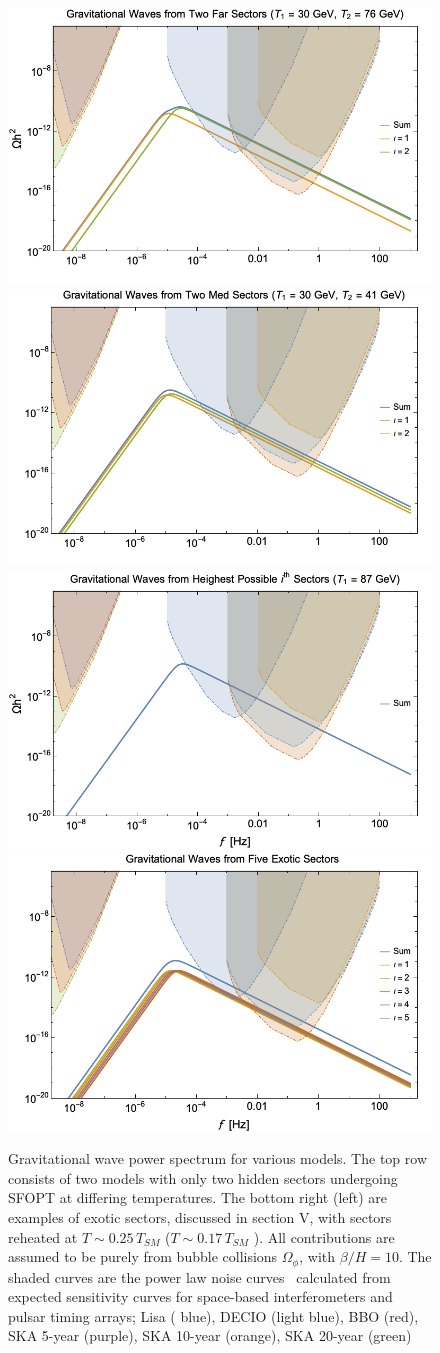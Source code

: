 \documentclass[nofootinbib,twocolumn,preprintnumbers]{revtex4-1}
\begin{document}
\begin{figure}[tb]
\centering
\begin{minipage}[c]{\textwidth}
\includegraphics[width=.45\textwidth]{TwoFar.png} 
\hfill
\includegraphics[width=.45\textwidth]{TwoMed.png} 
\hfill
\includegraphics[width=.45\textwidth ]{highest.png}
\hfill
\includegraphics[width=.45\textwidth]{energydensity.png} 
\end{minipage}
\hfill
\caption{ Gravitational wave power spectrum for various models. The top row consists of two models with only two hidden sectors undergoing SFOPT at differing temperatures. The bottom right (left) are examples of exotic sectors, discussed in section V, with sectors reheated at $T \sim 0.25\,T_{SM}$ ($T \sim 0.17\,T_{SM}$ ). All contributions are assumed to be purely from bubble collisions $\Omega_{\phi}$, with $\beta/H  = 10$.  The shaded curves are the power law noise curves~\cite{PhysRevD.88.124032} calculated from expected sensitivity curves for space-based interferometers and pulsar timing arrays; Lisa ( blue), DECIO (light blue), BBO (red), SKA 5-year (purple), SKA 10-year (orange), SKA 20-year (green)   }
\label{fig:Haa}
\end{figure}
\end{document}
